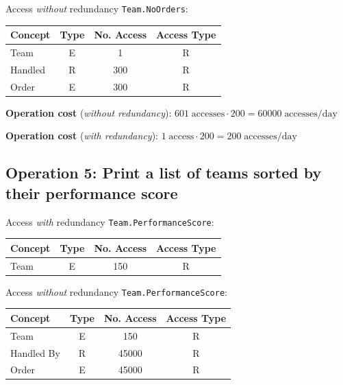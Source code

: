         Access \textit{without} redundancy \texttt{Team.NoOrders}:
    
    \begin{table}[h!]
        \centering
        \begin{tabular}{|l|c|c|c|}
            \hline
            \textbf{Concept} & \textbf{Type} & \textbf{No. Access} & \textbf{Access Type} \\
            \hline
            Team    & E & 1 & R \\
            \hline
            Handled & R & 300 & R \\
            \hline
            Order  & E & 300 & R \\
            \hline
        \end{tabular}
    \end{table}
    
    \textbf{Operation cost} (\textit{without redundancy}): $601 \; \text{accesses} \cdot 200 = 60000 \; \text{accesses/day}$

    \textbf{Operation cost} (\textit{with redundancy}): $1 \; \text{access} \cdot 200 = 200 \; \text{accesses/day}$  


    \subsection*{Operation 5: Print a list of teams sorted by their performance score}
    
    Access \textit{with} redundancy \texttt{Team.PerformanceScore}:
    
    \begin{table}[h!]
    \centering
    \begin{tabular}{|l|c|c|c|}
    \hline
    \textbf{Concept} & \textbf{Type} & \textbf{No. Access} & \textbf{Access Type} \\
    \hline
    Team    & E & 150 & R \\
    \hline
    \end{tabular}
    \end{table}
    
    Access \textit{without} redundancy \texttt{Team.PerformanceScore}:
    
    \begin{table}[h!]
    \centering
    \begin{tabular}{|l|c|c|c|}
    \hline
    \textbf{Concept} & \textbf{Type} & \textbf{No. Access} & \textbf{Access Type} \\
    \hline
    Team       & E & 150    & R \\
    \hline
    Handled By & R & 45000  & R \\
    \hline
    Order      & E & 45000  & R \\
    \hline
    \end{tabular}
    \end{table}
    

